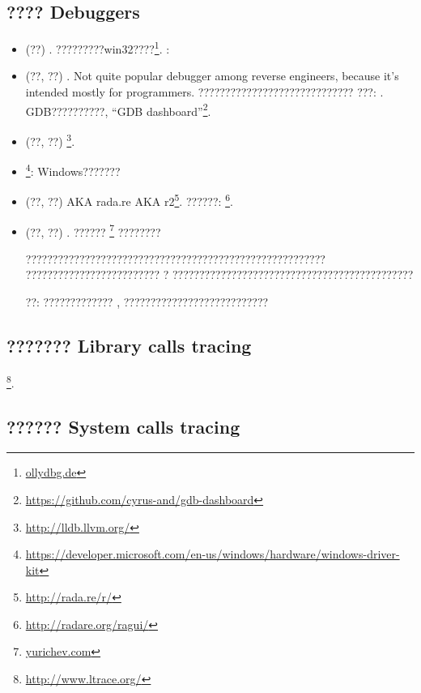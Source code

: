 \subsection{???? Debuggers}

\myindex{\olly}

\begin{itemize}
\item (??) .
?????????win32????\footnote{\href{http://go.yurichev.com/17032}{ollydbg.de}}.
\ShortHotKeyCheatsheet: 

\item (??, ??) .
Not quite popular debugger among reverse engineers, because it's intended mostly for programmers.
?????????????????????????????
???: .
GDB??????????, ``GDB dashboard''\footnote{\url{https://github.com/cyrus-and/gdb-dashboard}}.

\item (??, ??) \footnote{\url{http://lldb.llvm.org/}}.

\item {}\footnote{\url{https://developer.microsoft.com/en-us/windows/hardware/windows-driver-kit}}:
Windows???????

\item (??, ??)  \ac{AKA} rada.re \ac{AKA} r2\footnote{\url{http://rada.re/r/}}.
??????: \footnote{\url{http://radare.org/ragui/}}.

\item (??, ??) .
\label{tracer}
?????? 
\footnote{\href{http://go.yurichev.com/17338}{yurichev.com}}
????????

????????????????????????????????????????????????????????
????????????????????????? ?
?????????????????????????????????????????????


??: ????????????? , ???????????????????????????
\end{itemize}

\subsection{??????? Library calls tracing}

\footnote{\url{http://www.ltrace.org/}}.

\subsection{?????? System calls tracing}

